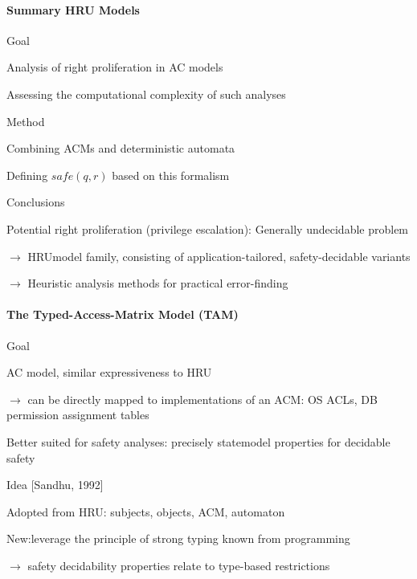 \documentclass[a4paper]{article}
\begin{document}
\begin{multicols}{3}
    \paragraph{Summary HRU Models}
    Goal
    \begin{itemize*}
        \item Analysis of right proliferation in AC models
        \item Assessing the computational complexity of such analyses
    \end{itemize*}

    Method
    \begin{itemize*}
        \item Combining ACMs and deterministic automata
        \item Defining $safe(q,r)$ based on this formalism
    \end{itemize*}

    Conclusions
    \begin{itemize*}
        \item Potential right proliferation (privilege escalation): Generally undecidable problem
        \item $\rightarrow$  HRUmodel family, consisting of application-tailored, safety-decidable variants
        \item $\rightarrow$  Heuristic analysis methods for practical error-finding
    \end{itemize*}

    \paragraph{The Typed-Access-Matrix Model (TAM)}
    Goal
    \begin{itemize*}
        \item AC model, similar expressiveness to HRU
        \item $\rightarrow$  can be directly mapped to implementations of an ACM: OS ACLs, DB permission assignment tables
        \item Better suited for safety analyses: precisely statemodel properties for decidable safety
    \end{itemize*}

    Idea [Sandhu, 1992]
    \begin{itemize*}
        \item Adopted from HRU: subjects, objects, ACM, automaton
        \item New:leverage the principle of strong typing known from programming
        \item $\rightarrow$  safety decidability properties relate to type-based restrictions
    \end{itemize*}


\end{multicols}
\end{document}
